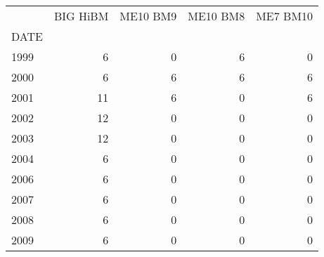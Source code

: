\begin{tabular}{lrrrr}
\toprule
 & BIG HiBM & ME10 BM9 & ME10 BM8 & ME7 BM10 \\
DATE &  &  &  &  \\
\midrule
1999 & 6 & 0 & 6 & 0 \\
2000 & 6 & 6 & 6 & 6 \\
2001 & 11 & 6 & 0 & 6 \\
2002 & 12 & 0 & 0 & 0 \\
2003 & 12 & 0 & 0 & 0 \\
2004 & 6 & 0 & 0 & 0 \\
2006 & 6 & 0 & 0 & 0 \\
2007 & 6 & 0 & 0 & 0 \\
2008 & 6 & 0 & 0 & 0 \\
2009 & 6 & 0 & 0 & 0 \\
\bottomrule
\end{tabular}